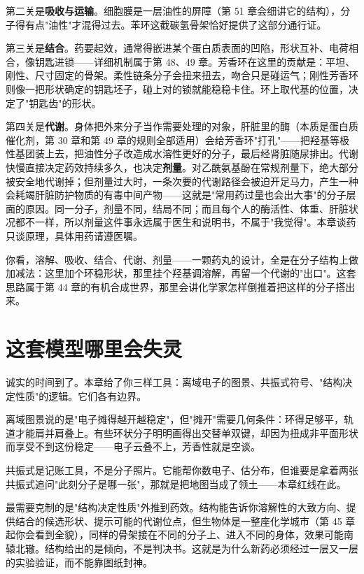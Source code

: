 第二关是\textbf{吸收与运输}。细胞膜是一层油性的屏障（第 51 章会细讲它的结构），分子得有点"油性"才混得过去。苯环这截碳氢骨架恰好提供了这部分通行证。

第三关是\textbf{结合}。药要起效，通常得嵌进某个蛋白质表面的凹陷，形状互补、电荷相合，像钥匙进锁——详细机制属于第 48、49 章。芳香环在这里的贡献是：平坦、刚性、尺寸固定的骨架。柔性链条分子会扭来扭去，吻合只是碰运气；刚性芳香环则像一把形状确定的钥匙坯子，碰上对的锁就能稳稳卡住。环上取代基的位置，决定了"钥匙齿"的形状。

第四关是\textbf{代谢}。身体把外来分子当作需要处理的对象，肝脏里的酶（本质是蛋白质催化剂，第 30 章和第 49 章的规则全部适用）会给芳香环"打孔"——把羟基等极性基团装上去，把油性分子改造成水溶性更好的分子，最后经肾脏随尿排出。代谢快慢直接决定药效持续多久，也决定\textbf{剂量}。对乙酰氨基酚在常规剂量下，绝大部分被安全地代谢掉；但剂量过大时，一条次要的代谢路径会被迫开足马力，产生一种会耗竭肝脏防护物质的有毒中间产物——这就是"常用药过量也会出大事"的分子层面的原因。同一分子，剂量不同，结局不同；而且每个人的酶活性、体重、肝脏状况都不一样，所以剂量这件事永远属于医生和说明书，不属于"我觉得"。本章谈药只谈原理，具体用药请遵医嘱。

你看，溶解、吸收、结合、代谢、剂量——一颗药丸的设计，全是在分子结构上做加减法：这里加个环稳形状，那里挂个羟基调溶解，再留一个代谢的"出口"。这套思路属于第 44 章的有机合成世界，那里会讲化学家怎样倒推着把这样的分子搭出来。

\section{这套模型哪里会失灵}

诚实的时间到了。本章给了你三样工具：离域电子的图景、共振式符号、"结构决定性质"的逻辑。它们各有边界。

离域图景说的是"电子摊得越开越稳定"，但"摊开"需要几何条件：环得足够平，轨道才能肩并肩叠上。有些环状分子明明画得出交替单双键，却因为扭成非平面形状而享受不到这份稳定——电子云叠不上，芳香性就是空谈。

共振式是记账工具，不是分子照片。它能帮你数电子、估分布，但谁要是拿着两张共振式追问"此刻分子是哪一张"，那就是把地图当成了领土——本章红线在此。

最需要克制的是"结构决定性质"外推到药效。结构能告诉你溶解性的大致方向、提供结合的候选形状、提示可能的代谢位点，但生物体是一整座化学城市（第 45 章起你会看到全貌），同样的骨架接在不同的分子上、进入不同的身体，效果可能南辕北辙。结构给出的是倾向，不是判决书。这就是为什么新药必须经过一层又一层的实验验证，而不能靠图纸封神。

